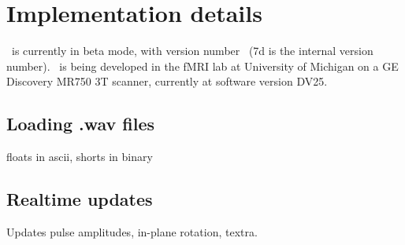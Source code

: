 
\chapter{Implementation details}

\toppe~is currently in beta mode, with version number \toppeversion~(7d is the internal version number).
\toppe~is being developed in the fMRI lab at University of Michigan on a GE Discovery MR750 3T scanner, currently at software version DV25.

\section{Loading .wav files}

floats in ascii, shorts in binary


\section{Realtime updates}

Updates pulse amplitudes, in-plane rotation, textra.
